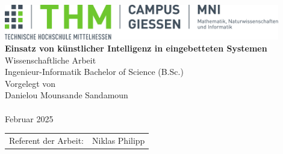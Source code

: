\documentclass[%
    BCOR=8.25mm,         %
    DIV=11,              %
    openany,
    parskip=half,        %
    bibliography=totoc,  %
    headsepline=on,      %
]{scrbook}
\begin{document}
\begin{titlepage}
    \begin{center}
    \includegraphics[width=0.9\textwidth]{img/mni-logo.pdf}\\[4cm]
    
    \textbf{\huge\sffamily Einsatz von künstlicher Intelligenz in eingebetteten Systemen
    }\\[1.5cm]
    \Large Wissenschaftliche Arbeit\\
    Ingenieur-Informatik Bachelor of Science (B.Sc.)
    \\[1cm]
    Vorgelegt von\\ [1.0cm]
    
    Danielou Mounsande Sandamoun\\~\\
    Februar 2025
    \end{center}
    \vfill
    \begin{tabular}{ll}
        Referent der Arbeit: & Niklas Philipp\\ 
    \end{tabular}
\end{titlepage}
\cleardoubleemptypage

\newpage

\cleardoubleemptypage

\tableofcontents

\mainmatter 
\pagestyle{fancy}







\backmatter 

\listoffigures
                                                                                           
\nocite{*} %
\printbibliography %
\end{document}

